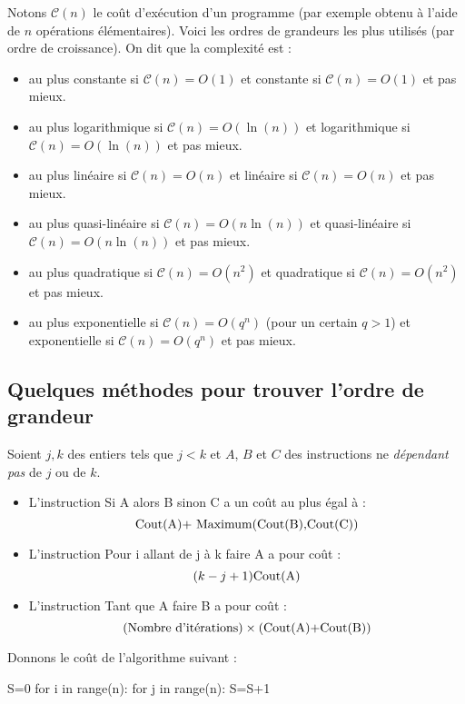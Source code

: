 \documentclass[french,11pt,twoside]{VcCours}
\begin{document}
Notons $\mathcal{C}(n)$ le coût d'exécution d'un programme (par exemple obtenu à l'aide de $n$ opérations élémentaires).  Voici les ordres de grandeurs les plus utilisés (par ordre de croissance). On dit que la complexité est :

\begin{itemize}
\item au plus constante si $\mathcal{C}(n)=O(1)$ et constante si $\mathcal{C}(n)=O(1)$ et pas mieux.
\item au plus logarithmique si $\mathcal{C}(n)=O(\ln(n))$ et logarithmique si $\mathcal{C}(n)=O(\ln(n))$ et pas mieux.
\item au plus linéaire si $\mathcal{C}(n)=O(n)$ et linéaire si $\mathcal{C}(n)=O(n)$ et pas mieux.
\item au plus quasi-linéaire si $\mathcal{C}(n)=O(n\ln(n))$ et quasi-linéaire si $\mathcal{C}(n)=O(n\ln(n))$ et pas mieux.
\item au plus quadratique si $\mathcal{C}(n)=O(n^2)$ et quadratique si $\mathcal{C}(n)=O(n^2)$ et pas mieux.
\item au plus exponentielle si $\mathcal{C}(n)=O(q^n)$ (pour un certain $q>1$) et exponentielle si $\mathcal{C}(n)=O(q^n)$ et pas mieux.
\end{itemize}

\subsection{Quelques méthodes pour trouver l'ordre de grandeur}
Soient $j,k$ des entiers tels que $j<k$ et $A$, $B$ et $C$ des instructions ne \emph{dépendant pas} de $j$ ou de $k$.

\begin{itemize}
\item L'instruction \og Si A alors B sinon C \fg{} a un coût au plus égal à :
$$ \hbox{Cout(A)+ Maximum(Cout(B),Cout(C))}$$
\item L'instruction \og Pour i allant de j à k faire A \fg{} a pour coût :
$$ (k-j+1)\hbox{Cout(A)}$$
\item  L'instruction \og Tant que A faire B \fg{} a pour coût :
$$ \hbox{(Nombre d'itérations)} \times \hbox{(Cout(A)+Cout(B))}$$
\end{itemize}

\vspace{-1em}
\begin{Exercice}{} Donnons le coût de l'algorithme suivant : 
\end{Exercice}
\begin{minipage}{\linewidth}
\begin{Python}
S=0
for i in range(n):
    for j in range(n):
        S=S+1
\end{Python} 
\end{minipage}
\end{document}
